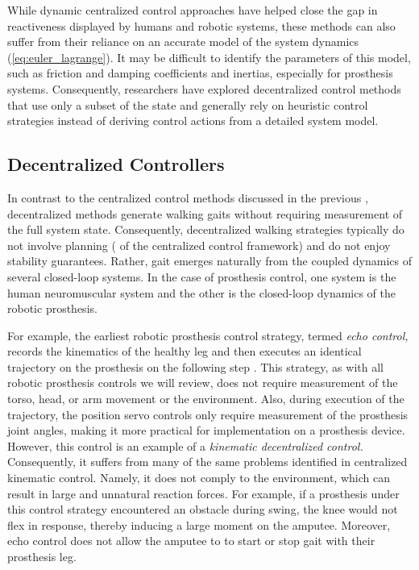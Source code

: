 While dynamic centralized control approaches have helped close the gap in
reactiveness displayed by humans and robotic systems, these methods can also
suffer from their reliance on an accurate model of the system dynamics
(\cref{eq:euler_lagrange}). It may be difficult to identify the parameters of
this model, such as friction and damping coefficients and inertias, especially
for prosthesis systems. Consequently, researchers have explored decentralized
control methods that use only a subset of the state and generally rely on
heuristic control strategies instead of deriving control actions from a detailed
system model. 

\subsection{Decentralized Controllers}\label{sec:back_decentralized_control} 
In contrast to the centralized control methods discussed in the previous
, decentralized methods generate walking
gaits without requiring measurement of the full system state. Consequently,
decentralized walking strategies typically do not involve
planning ( of the
centralized control framework) and do not enjoy stability guarantees. Rather,
gait emerges naturally from the coupled dynamics of several closed-loop systems.
In the case of prosthesis control, one system is the human neuromuscular
system and the other is the closed-loop dynamics of the robotic prosthesis.

For example, the earliest robotic prosthesis control strategy, termed \emph{echo
control,} records the kinematics of the healthy leg and then executes an
identical trajectory on the prosthesis on the following step
\citep{grimes1977feasibility, grimes1979active}. This strategy, as with all
robotic prosthesis controls we will review, does not require measurement of the
torso, head, or arm movement or the environment. Also, during execution of the
trajectory, the position servo controls only require measurement of the
prosthesis joint angles, making it more practical for implementation on a
prosthesis device. However, this control is an example of a \emph{kinematic
decentralized control.} Consequently, it suffers from many of the same problems
identified in centralized kinematic control. Namely, it does not comply to the
environment, which can result in large and unnatural reaction forces. For
example, if a prosthesis under this control strategy encountered an obstacle
during swing, the knee would not flex in response, thereby inducing a large
moment on the amputee.  Moreover, echo control does not allow the amputee to to
start or stop gait with their prosthesis leg.

